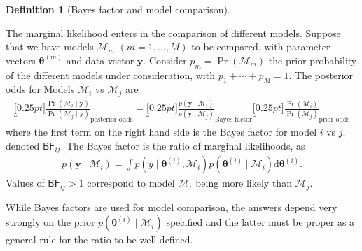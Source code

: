 \documentclass[
  11pt,
  letterpaper,
]{scrbook}
\theoremstyle{definition}
\newtheorem{definition}{Definition}[chapter]
\theoremstyle{plain}
\theoremstyle{plain}
\theoremstyle{definition}
\theoremstyle{definition}
\theoremstyle{remark}
\begin{document}
\begin{definition}[Bayes factor and model
comparison]\protect\hypertarget{def-bayes-factor}{}\label{def-bayes-factor}

The marginal likelihood enters in the comparison of different models.
Suppose that we have models \(\mathcal{M}_m\) \((m=1, \ldots, M)\) to be
compared, with parameter vectors \(\boldsymbol{\theta}^{(m)}\) and data
vector \(\boldsymbol{y}\). Consider \(p_m =\Pr(\mathcal{M}_m)\) the
prior probability of the different models under consideration, with
\(p_1 + \cdots + p_M = 1\). The posterior odds for Models
\(\mathcal{M}_i\) vs \(\mathcal{M}_j\) are \begin{align*}
\underbracket[0.25pt]{\frac{\Pr(\mathcal{M}_i \mid \boldsymbol{y})}{\Pr(\mathcal{M}_j \mid \boldsymbol{y})}}_{\text{posterior odds}} = \underbracket[0.25pt]{\frac{p(\boldsymbol{y} \mid \mathcal{M}_i)}{p(\boldsymbol{y} \mid \mathcal{M}_j)}}_{\text{Bayes factor}} \underbracket[0.25pt]{\frac{\Pr(\mathcal{M}_i)}{\Pr(\mathcal{M}_j)}}_{\text{prior odds}}
\end{align*} where the first term on the right hand side is the Bayes
factor for model \(i\) vs \(j\), denoted \(\mathsf{BF}_{ij}\). The Bayes
factor is the ratio of marginal likelihoods, as \begin{align*}
p(\boldsymbol{y} \mid \mathcal{M}_i) = \int p(y \mid \boldsymbol{\theta}^{(i)}, \mathcal{M}_i) p( \boldsymbol{\theta}^{(i)} \mid \mathcal{M}_i) \mathrm{d}  \boldsymbol{\theta}^{(i)}.
\end{align*} Values of \(\mathsf{BF}_{ij}>1\) correspond to model
\(\mathcal{M}_i\) being more likely than \(\mathcal{M}_j\).

While Bayes factors are used for model comparison, the answers depend
very strongly on the prior
\(p( \boldsymbol{\theta}^{(i)} \mid \mathcal{M}_i)\) specified and the
latter must be proper as a general rule for the ratio to be
well-defined.

\end{definition}
\end{document}
